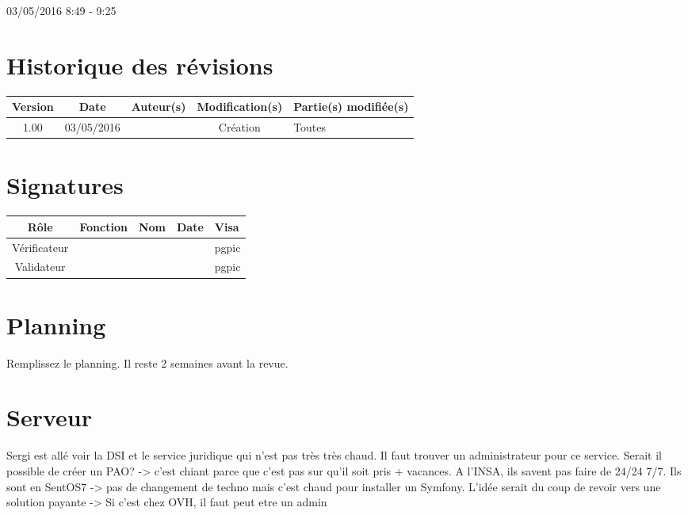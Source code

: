 \documentclass [a4paper] {article}
\begin{document}
03/05/2016			 				%
\hfill   
\hfill 	 8:49 - 9:25				%



\section*{Historique des révisions}
\begin{center}
			\begin{tabular}{| c | c | c | c | p{4cm} |}
				\hline
				\rowcolor{Gray}
				Version & Date & Auteur(s) & Modification(s) & Partie(s) modifiée(s)		 \\
				\hline
				1.00 & 03/05/2016 & \Pierre & Création & Toutes \\
		\hline		
			\end{tabular}
		\end{center}

\section*{Signatures}

		\begin{center}
			\begin{tabular}{| c | c | c | c | p{4cm} |}
				\hline
				\rowcolor{Gray}
				Rôle & Fonction & Nom & Date & Visa		 \\
				\hline
				Vérificateur & \RQA & \Kafui &  & pgpic \\[30pt]
				\hline
				Validateur & \CP & \Sergi &  & pgpic \\[30pt]	
				\hline
			\end{tabular}
		\end{center}


\section{Planning}
Remplissez le planning. Il reste 2 semaines avant la revue. 

\section{Serveur}
Sergi est allé voir la DSI et le service juridique qui n'est pas très très chaud. Il faut trouver un administrateur pour ce service. Serait il possible de créer un PAO? -> c'est chiant parce que c'est pas sur qu'il soit pris + vacances. A l'INSA, ils savent pas faire de 24/24 7/7. Ils sont en SentOS7 -> pas de changement de techno mais c'est chaud pour installer un Symfony. L'idée serait du coup de revoir vers une solution payante -> Si c'est chez OVH, il faut peut etre un admin
\end{document}
